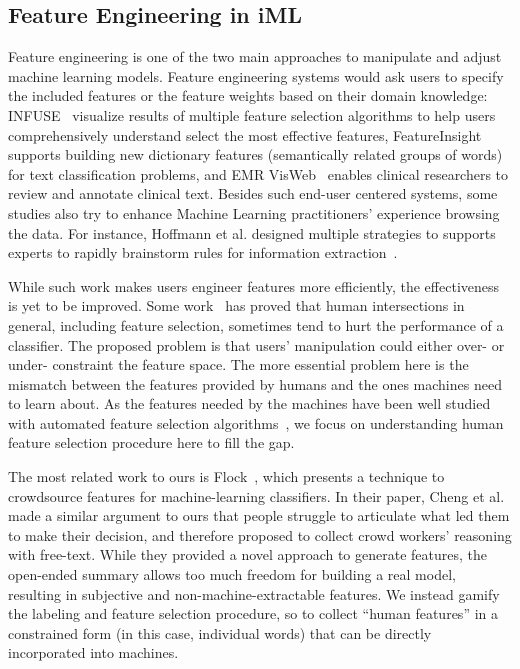 \documentclass[chi_draft]{sigchi}
\begin{document}
\subsection{Feature Engineering in iML}
Feature engineering is one of the two main approaches to manipulate and adjust machine learning models.
Feature engineering systems would ask users to specify the included features or the feature weights based on their domain knowledge: INFUSE~\cite{krause2014infuse} visualize results of multiple feature selection algorithms to help users comprehensively understand select the most effective features, FeatureInsight~\cite{brooks2015featureinsight} supports building new dictionary features (semantically related groups of words) for text classification problems, and EMR VisWeb~\cite{trivedi2015interactive} enables clinical researchers to review and annotate clinical text.
Besides such end-user centered systems, some studies also try to enhance Machine Learning practitioners' experience browsing the data. For instance, Hoffmann et al. designed multiple strategies to supports experts to rapidly brainstorm rules for information extraction~\cite{hoffmann2015extreme}.

While such work makes users engineer features more efficiently, the effectiveness is yet to be improved.
Some work~\cite{fiebrink2011human,stumpf2009interacting, patel2008investigating} has proved that human intersections in general, including feature selection, sometimes tend to hurt the performance of a classifier. 
The proposed problem is that users' manipulation could either over- or under- constraint the feature space.
The more essential problem here is the mismatch between the features provided by humans and the ones machines need to learn about. 
As the features needed by the machines have been well studied with automated feature selection algorithms~\cite{empirical}, we focus on understanding human feature selection procedure here to fill the gap. 

The most related work to ours is Flock~\cite{cheng2015flock}, which presents a technique to crowdsource features for machine-learning classifiers.
In their paper, Cheng et al. made a similar argument to ours that people struggle to articulate what led them to make their decision, and therefore proposed to collect crowd workers' reasoning with free-text.
While they provided a novel approach to generate features, the open-ended summary allows too much freedom for building a real model, resulting in subjective and non-machine-extractable features.
We instead gamify the labeling and feature selection procedure, so to collect ``human features'' in a constrained form (in this case, individual words) that can be directly incorporated into machines.
\end{document}

